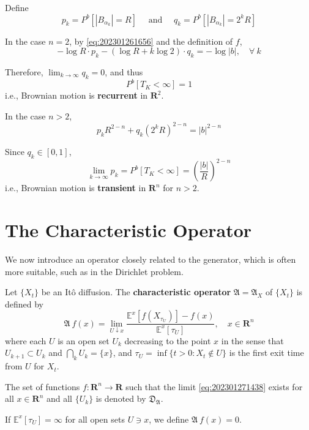 \begin{example}
    Define 
    \[
        p_k = P^b[|B_{\alpha_k}| = R] \quad \text{ and } \quad q_k = P^b[|B_{\alpha_k}| = 2^k R]
    \]

    In the case $n = 2$, by \eqref{eq:202301261656} and the definition of $f$, 
    \[
        - \log R \cdot p_k - (\log R + k \log 2) \cdot q_k = - \log |b|, \quad \forall ~k
    \]

    Therefore, $\lim_{k \to \infty} q_k = 0$, and thus 
    \[
        P^b[T_K < \infty] = 1
    \]
    i.e., Brownian motion is \textbf{recurrent} in $\textbf{R}^2$. 

    In the case $n > 2$, 
    \[
        p_k R^{2-n} + q_k (2^k R)^{2-n} = |b|^{2-n}
    \]

    Since $q_k \in [0,1]$, 
    \[
        \lim_{k \to \infty} p_k = P^b[T_K < \infty] = \left( \frac{|b|}{R} \right)^{2-n}
    \]
    i.e., Brownian motion is \textbf{transient} in $\textbf{R}^n$ for $n > 2$. 
\end{example}

\section{The Characteristic Operator}

We now introduce an operator closely related to the generator, which is often more suitable, such as in the Dirichlet problem.

\begin{definition}
    Let $\{ X_t \}$ be an Itô diffusion. The \textbf{characteristic operator} $\mathfrak{A} = \mathfrak{A}_X$ of $\{ X_t \}$ is defined by 
    \begin{equation}\label{eq:202301271438}
        \mathfrak{A}~f(x) = \lim_{U \downarrow x} \frac{\mathbb{E}^x [ f(X_{\tau_U})] - f(x)}{\mathbb{E}^x [\tau_U]}, \quad x \in \textbf{R}^n
    \end{equation}
    where each $U$ is an open set $U_k$ decreasing to the point $x$ in the sense that $U_{k+1} \subset U_k$ and $\bigcap_k U_k = \{ x \}$, and $\tau_U = \inf \{ t > 0 : X_t \notin U \}$ is the first exit time from $U$ for $X_t$.

    The set of functions $f : \textbf{R}^n \longrightarrow \textbf{R}$ such that the limit \eqref{eq:202301271438} exists for all $x \in \mathbf{R}^n$ and all $\{ U_k \}$ is denoted by $\mathfrak{D}_{\mathfrak{A}}$.

    If $\mathbb{E}^x[\tau_U] = \infty$ for all open sets $U \ni x$, we define $\mathfrak{A}~f(x) = 0$.
\end{definition}

